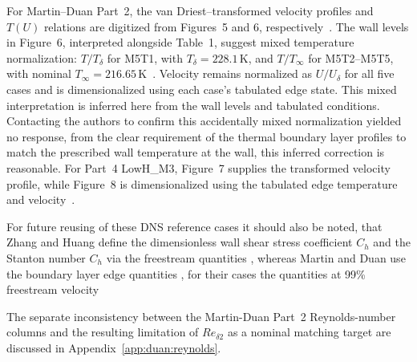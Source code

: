 For Martin--Duan Part~2, the van Driest--transformed velocity profiles and \(T(U)\) relations are digitized from Figures~5 and 6, respectively~\cite{duan2010direct_part2}. The wall levels in Figure~6, interpreted alongside Table~1, suggest mixed temperature normalization: \(T/T_\delta\) for M5T1, with \(T_\delta=228.1\,\mathrm{K}\), and \(T/T_\infty\) for M5T2--M5T5, with nominal \(T_\infty=216.65\,\mathrm{K}\)~\cite[Table~1]{martin2007direct_Part1}. Velocity remains normalized as \(U/U_\delta\) for all five cases and is dimensionalized using each case's tabulated edge state. This mixed interpretation is inferred here from the wall levels and tabulated conditions. Contacting the authors to confirm this accidentally mixed normalization yielded no response, from the clear requirement of the thermal boundary layer profiles to match the prescribed wall temperature at the wall, this inferred correction is reasonable. For Part~4 LowH\_M3, Figure~7 supplies the transformed velocity profile, while Figure~8 is dimensionalized using the tabulated edge temperature and velocity~\cite{duan2011direct_Part4}.
\par\medskip

For future reusing of these DNS reference cases it should also be noted, that Zhang and Huang define the dimensionless wall shear stress coefficient \(C_h\) and the Stanton number \(C_h\) via the freestream quantities \cite[Nomenclature]{zhang2018direct,huang2020simulation}, whereas Martin and Duan use the boundary layer edge quantities \cite[p.424]{duan2010direct_part2}, for their cases the quantities at 99\% freestream velocity \cite[p. 421]{duan2010direct_part2}
\par\medskip

The separate inconsistency between the Martin-Duan Part~2 Reynolds-number columns and the resulting limitation of \(Re_{\delta2}\) as a nominal matching target are discussed in Appendix~\ref{app:duan:reynolds}.
